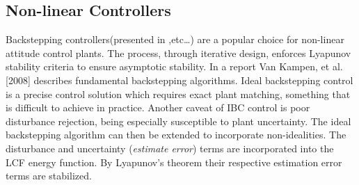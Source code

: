 {\subsection{Non-linear Controllers}
\label{subsec:control.attitude.nonlinear}
Backstepping controllers(presented in \cite{satellitebackstepping,intelligentbackstep,backstepslidingmode},etc\ldots) are a popular choice for non-linear attitude control plants. The process, through iterative design, enforces Lyapunov stability criteria to ensure asymptotic stability. In a report \cite{backstepping} Van Kampen, et al. [2008] describes fundamental backstepping algorithms. Ideal backstepping control is a precise control solution which requires exact plant matching, something that is difficult to achieve in practice. Another caveat of IBC control is poor disturbance rejection, being especially susceptible to plant uncertainty. The ideal backstepping algorithm can then be extended to incorporate non-idealities. The disturbance and uncertainty (\emph{estimate error}) terms are incorporated into the LCF energy function. By Lyapunov's theorem their respective estimation error terms are stabilized.
}
